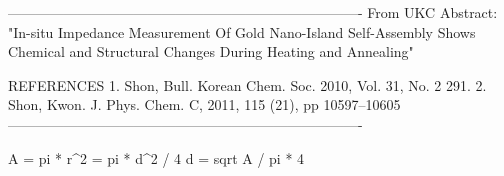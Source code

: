 



----------------------------------------------------------------------------
From UKC Abstract: 
"In-situ Impedance Measurement Of Gold Nano-Island Self-Assembly Shows Chemical 
    and Structural Changes During Heating and Annealing"

REFERENCES
1.     Shon, Bull. Korean Chem. Soc. 2010, Vol. 31, No. 2 291.
2.    Shon, Kwon. J. Phys. Chem. C, 2011, 115 (21), pp 10597–10605
----------------------------------------------------------------------------

A = pi * r^2 = pi * d^2 / 4
d = sqrt { A / pi * 4 }
